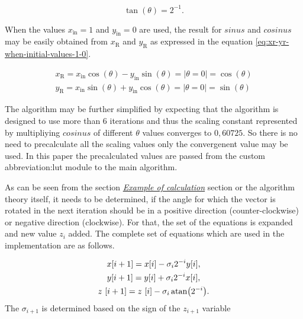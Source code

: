 \documentclass[a4paper, twoside, 11pt]{article}
\begin{document}
        \begin{equation}\label{eq:tan-theta-2}
            \tan (\theta) = 2^{-1}.
        \end{equation}
        \par
        When the values $x_\text{in} = 1$ and $y_\text{in} = 0$ are used, the result for $sinus$ and $cosinus$ may be easily obtained from $x_\text{R}$ and $y_\text{R}$ as expressed in the equation \ref{eq:xr-yr-when-initial-values-1-0}.

        \begin{equation}\label{eq:xr-yr-when-initial-values-1-0}
            \begin{gathered}
            x_\text{R} = x_\text{in} \cos (\theta) - y_\text{in} \sin (\theta) = | \theta = 0 | = \cos (\theta)\\
            y_\text{R} = x_\text{in} \sin (\theta) + y_\text{in} \cos (\theta) = | \theta = 0 | = \sin (\theta)
            \end{gathered}
        \end{equation}

            The algorithm may be further simplified by expecting that the algorithm is designed to use more than 6 iterations and thus the scaling constant represented by multipliying $cosinus$ of different $\theta$ values converges to $0,60725$. So there is no need to precalculate all the scaling values only the convergenent value may be used. In this paper the precalculated values are passed from the custom \gls{abbreviation:lut} module to the main algorithm.\par
            As can be seen from the section \hyperref[subsubsec:example-of-calculation]{\textit{Example of calculation}} section or the algorithm theory itself, it needs to be determined, if the angle for which the vector is rotated in the next iteration should be in a positive direction (counter-clockwise) or negative direction (clockwise). For that, the set of the equations is expanded and new value $z_i$ added. The complete set of equations which are used in the implementation are as follows.

            \begin{equation}
                \begin{gathered}
                x [i+1] = x [i] - \sigma_i 2^{-i} y[i],\\
                y [i+1] = y [i] + \sigma_i 2^{-i} x[i],\\
                z~[i+1] = z~[i] - \sigma_i \atan (2^{-i}).
                \end{gathered}
            \end{equation}
            The $\sigma_{i+1}$ is determined based on the sign of the $z_{i+1}$ variable
\end{document}
